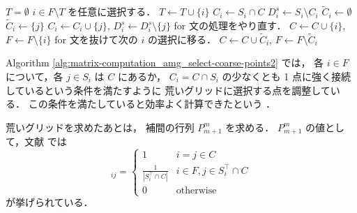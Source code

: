 \begin{algorithm}[tp]
    \caption{Algebraic Multigrid (AMG) 法における荒いグリッドの点の選択（ステップ 2）%
        （\cite{Ruge1987} をもとに一部変更）}
    \label{alg:matrix-computation_amg_select-coarse-points2}
    \begin{algorithmic}[1]
        \State $T = \emptyset$
        \State $i \in F \setminus T$ を任意に選択する．
        \State $T \gets T \cup \{i\}$
        \State $C_i \gets S_i \cap C$
        \State $D_i^s \gets S_i \setminus C_i$
        \State $\tilde{C}_i \gets \emptyset$
        \State $\tilde{C}_i \gets \{j\}$
        \State $C_i \gets C_i \cup \{j\}$, $D_i^s \gets D_i^s \setminus \{j\}$
        \State for 文の処理をやり直す．
        \Else
        \State $C \gets C \cup \{i\}$, $F \gets F \setminus \{i\}$
        \State for 文を抜けて次の $i$ の選択に移る．
        \EndIf
        \EndIf
        \EndFor
        \State $C \gets C \cup \tilde{C}_i$, $F \gets F \setminus \tilde{C}_i$
        \EndWhile
        \EndProcedure
    \end{algorithmic}
\end{algorithm}

Algorithm \ref{alg:matrix-computation_amg_select-coarse-points2}
では，
各 $i \in F$ について，各 $j \in S_i$ は $C$ にあるか，
$C_i = C \cap S_i$ の少なくとも 1 点に強く接続しているという条件を満たすように
荒いグリッドに選択する点を調整している．
この条件を満たしていると効率よく計算できたという
\cite{Ruge1987}．

荒いグリッドを求めたあとは，
補間の行列 $P_{m+1}^m$ を求める．
$P_{m+1}^m$ の値として，文献 \cite{Wolters2002} では
\begin{equation}
    [P_{m+1}^m]_{ij} =
    \begin{cases}
        1                                      & i = j \in C                    \\
        \frac{1}{\left|S_i^\top \cap C\right|} & i \in F, j \in S_i^\top \cap C \\
        0                                      & \mathrm{otherwise}
    \end{cases}
\end{equation}
が挙げられている．

